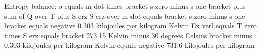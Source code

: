 Entropy balance:  
o equals m dot times bracket s zero minus s one bracket plus sum of Q over T plus S erz  
S erz over m dot equals bracket s zero minus s one bracket equals negative 0.303 kilojoules per kilogram Kelvin  
Ex verl equals T zero times S erz equals bracket 273.15 Kelvin minus 30 degrees Celsius bracket minus 0.303 kilojoules per kilogram Kelvin  
equals negative 731.6 kilojoules per kilogram